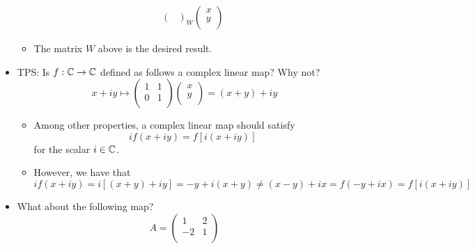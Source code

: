 \documentclass[../notes.tex]{subfiles}
\begin{document}
\begin{itemize}
\begin{itemize}
\begin{align*}
{\begin{pmatrix}
                    \end{pmatrix}
                }_W
                \begin{pmatrix}
                    x\\
                    y\\
                \end{pmatrix}
        \end{align*}
        \item The matrix $W$ above is the desired result.
    \end{itemize}
    \item TPS: Is $f:\mathbb{C}\to\mathbb{C}$ defined as follows a complex linear map? Why not?
    \begin{equation*}
        x+iy \mapsto
        \begin{pmatrix}
            1 & 1\\
            0 & 1\\
        \end{pmatrix}
        \begin{pmatrix}
            x\\
            y\\
        \end{pmatrix}
        = (x+y)+iy
    \end{equation*}
    \begin{itemize}
        \item Among other properties, a complex linear map should satisfy
        \begin{equation*}
            if(x+iy) = f[i(x+iy)]
        \end{equation*}
        for the scalar $i\in\mathbb{C}$.
        \item However, we have that
        \begin{equation*}
            if(x+iy) = i[(x+y)+iy]
            = -y+i(x+y)
            \neq (x-y)+ix
            = f(-y+ix)
            = f[i(x+iy)]
        \end{equation*}
    \end{itemize}
    \item What about the following map?
    \begin{equation*}
        A =
        \begin{pmatrix}
            1 & 2\\
            -2 & 1\\
        \end{pmatrix}
    \end{equation*}
    \begin{itemize}

\end{itemize}
\end{itemize}
\end{document}
